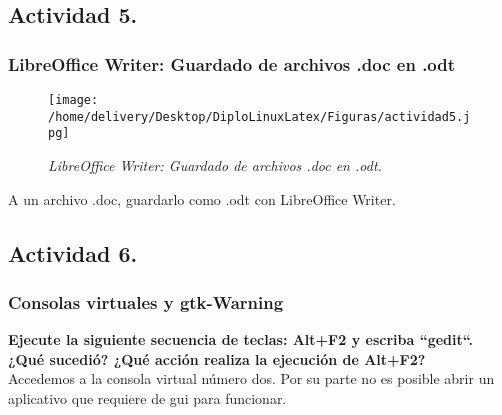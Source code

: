\documentclass[a4paper,11pt,spanish]{article} %
\begin{document}
\clearpage
\pagebreak

\subsection{Actividad 5.}

\subsubsection{LibreOffice Writer: Guardado de archivos .doc en .odt }

\begin{figure}[h!] 
\centering
\texttt{[image: /home/delivery/Desktop/DiploLinuxLatex/Figuras/actividad5.jpg]}
\caption{\emph{LibreOffice Writer: Guardado de archivos .doc en .odt.}}
\end{figure}

A un archivo .doc, guardarlo como .odt con LibreOffice Writer.

\pagebreak

\subsection{Actividad 6.}

\subsubsection{Consolas virtuales y \ac{gtk}-Warning}

\textbf{Ejecute la siguiente secuencia de teclas:
Alt+F2 y escriba ``gedit``.
¿Qué sucedió? ¿Qué acción realiza la ejecución de Alt+F2?}\\

Accedemos a la consola virtual número dos. Por su parte no es posible abrir un aplicativo que 
requiere de \ac{gui} para funcionar.
\end{document}
